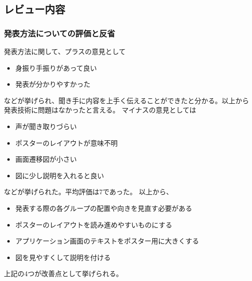 \documentclass[openany,11pt,papersize]{jsbook}
\begin{document}

\subsection{レビュー内容}

\subsubsection{発表方法についての評価と反省}
発表方法に関して、プラスの意見として
\begin{itemize}

\item 身振り手振りがあって良い
\item 発表が分かりやすかった

\end{itemize}
などが挙げられ、聞き手に内容を上手く伝えることができたと分かる。以上から発表技術に問題はなかったと言える。
マイナスの意見としては
\begin{itemize}

\item 声が聞き取りづらい
\item ポスターのレイアウトが意味不明
\item 画面遷移図が小さい
\item 図に少し説明を入れると良い

\end{itemize}
などが挙げられた。平均評価は7であった。
以上から、
\begin{itemize}

\item 発表する際の各グループの配置や向きを見直す必要がある
\item ポスターのレイアウトを読み進めやすいものにする
\item アプリケーション画面のテキストをポスター用に大きくする
\item 図を見やすくして説明を付ける

\end{itemize}
上記の4つが改善点として挙げられる。

\end{document}
